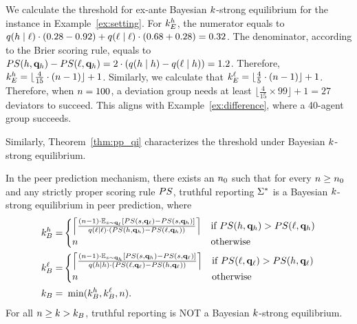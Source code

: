 \begin{example}
\label{ex:ex-ante}
    We calculate the threshold for ex-ante Bayesian $k$-strong equilibrium for the instance in Example~\ref{ex:setting}. For $k_E^h$, the numerator equals to $q(h \mid \ell) \cdot (0.28 - 0.92) + q(\ell \mid \ell)\cdot (0.68 + 0.28) = 0.32$. The denominator, according to the Brier scoring rule, equals to $PS(h, \mathbf{q}_h) - PS(\ell, \mathbf{q}_h) = 2\cdot (q(h \mid h) - q(\ell \mid h)) = 1.2$. Therefore, $k_E^h = \lfloor \frac{4}{15}\cdot (n-1)\rfloor + 1$. Similarly, we calculate that $k_E^\ell = \lfloor \frac{4}{5}\cdot (n-1)\rfloor + 1$. Therefore, when $n = 100$, a deviation group needs at least $\lfloor \frac{4}{15}\times 99\rfloor + 1 = 27$ deviators to succeed. This aligns with Example~\ref{ex:difference}, where a 40-agent group succeeds. 
\end{example}

Similarly, Theorem~\ref{thm:pp_qi} characterizes the threshold under Bayesian $k$-strong equilibrium. 

\begin{theorem}
\label{thm:pp_qi}
    In the peer prediction mechanism, there exists an $n_0$ such that for every $n \ge n_0$ and any strictly proper scoring rule $PS$, truthful reporting $\Sigma^*$ is a Bayesian $k$-strong equilibrium in peer prediction, where 
    \begin{align*}
        k_B^h =& \begin{cases}
         \left\lceil \frac{(n -1)\cdot \mathbb{E}_{s\sim \mathbf{q}_{\ell}}[PS(s, \mathbf{q}_{\ell}) - PS(s, \mathbf{q}_{h})]}{q(\ell \mid \ell)\cdot (PS(h, \mathbf{q}_h) - PS(\ell, \mathbf{q}_h))} \right\rceil  & \text{if}\ PS(h, \mathbf{q}_h) > PS(\ell, \mathbf{q}_h)\\
           n & \text{otherwise}
        \end{cases}\\
        k_B^\ell =& \begin{cases}
          \left\lceil \frac{(n - 1)\cdot \mathbb{E}_{s\sim \mathbf{q}_{h}}[PS(s, \mathbf{q}_{h}) - PS(s, \mathbf{q}_{\ell})]}{q(h\mid h)\cdot (PS(\ell, \mathbf{q}_\ell) - PS(h, \mathbf{q}_\ell))} \right\rceil & \text{if}\ PS(\ell, \mathbf{q}_\ell) > PS(h, \mathbf{q}_\ell)\\
           n & \text{otherwise}
        \end{cases}\\
        k_B =&\  \min(k_B^h, k_B^{\ell}, n). 
        \end{align*}
    For all $n\ge k > k_B $, truthful reporting is NOT a Bayesian $k$-strong equilibrium. 
    
\end{theorem}

